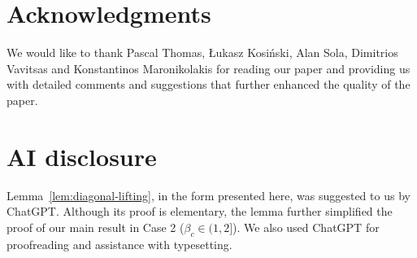 \documentclass[a4paper,12pt]{amsart}
\theoremstyle{definition}
\begin{document}
\section{Acknowledgments} We would like to thank Pascal Thomas, \L{}ukasz Kosi\'nski, Alan Sola, Dimitrios Vavitsas and Konstantinos Maronikolakis for reading our paper and providing us with detailed comments and suggestions that further enhanced the quality of the paper. 



\section{AI disclosure}

Lemma~\ref{lem:diagonal-lifting}, in the form presented here, was suggested to us by ChatGPT. Although its proof is elementary, the lemma further simplified the proof of our main result in Case 2 ($\beta_c\in(1,2]$). We also used ChatGPT for proofreading and assistance with typesetting.


\end{document}
